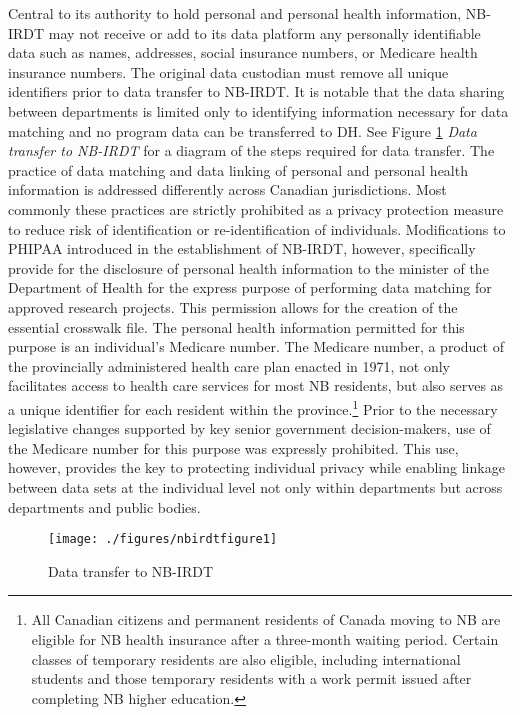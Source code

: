 Central to its authority to hold personal and personal health information, NB-IRDT may not receive or add to its data platform any personally identifiable data such as names, addresses, social insurance numbers, or Medicare health insurance numbers. The original data custodian must remove all unique identifiers prior to data transfer to NB-IRDT. It is notable that the data sharing between departments is limited only to identifying information necessary for data matching and no program data can be transferred to DH. See Figure \ref{fig:nbirdtfigure1} \emph{Data transfer to NB-IRDT} for a diagram of the steps required for data transfer. The practice of data matching and data linking of personal and personal health information is addressed differently across Canadian jurisdictions. Most commonly these practices are strictly prohibited as a privacy protection measure to reduce risk of identification or re-identification of individuals. Modifications to PHIPAA introduced in the establishment of NB-IRDT, however, specifically provide for the disclosure of personal health information to the minister of the Department of Health for the express purpose of performing data matching for approved research projects. This permission allows for the creation of the essential crosswalk file. The personal health information permitted for this purpose is an individual's Medicare number. The Medicare number, a product of the provincially administered health care plan enacted in 1971, not only facilitates access to health care services for most NB residents, but also serves as a unique identifier for each resident within the province.\footnote{All Canadian citizens and permanent residents of Canada moving to NB are eligible for NB health insurance after a three-month waiting period. Certain classes of temporary residents are also eligible, including international students and those temporary residents with a work permit issued after completing NB higher education.} Prior to the necessary legislative changes supported by key senior government decision-makers, use of the Medicare number for this purpose was expressly prohibited. This use, however, provides the key to protecting individual privacy while enabling linkage between data sets at the individual level not only within departments but across departments and public bodies.

\begin{figure}
\texttt{[image: ./figures/nbirdtfigure1]} \caption{Data transfer to NB-IRDT}\label{fig:nbirdtfigure1}
\end{figure}

